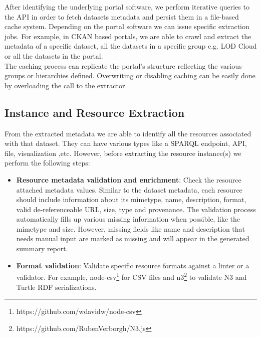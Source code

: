\documentclass[runningheads,a4paper]{llncs}
\begin{document}
After identifying the underlying portal software, we perform iterative queries to the API in order to fetch datasets metadata and persist them in a file-based cache system.
Depending on the portal software we can issue specific extraction jobs. For example, in CKAN based portals, we are able to crawl and extract the metadata of a specific dataset, all the datasets in a specific group e.g. LOD Cloud or all the datasets in the portal.\\The caching process can replicate the portal's structure reflecting the various groups or hierarchies defined. Overwriting or disabling caching can be easily done by overloading the call to the extractor.

\subsection{Instance and Resource Extraction}

From the extracted metadata we are able to identify all the resources associated with that dataset. They can have various types like a SPARQL endpoint, API, file, visualization ,etc. However, before extracting the resource instance(s) we perform the following steps:

\begin{itemize}
  \item \textbf{Resource metadata validation and enrichment}: Check the resource attached metadata values. Similar to the dataset metadata, each resource should include information about its mimetype, name, description, format, valid de-referenceable URL, size, type and provenance. The validation process automatically fills up various missing information when possible, like the mimetype and size. However, missing fields like name and description that needs manual input are marked as missing and will appear in the generated summary report.
  \item \textbf{Format validation}: Validate specific resource formats against a linter or a validator. For example, node-csv\footnote{https://github.com/wdavidw/node-csv} for CSV files and n3\footnote{https://github.com/RubenVerborgh/N3.js} to validate N3 and Turtle RDF serializations.
\end{itemize}
\end{document}
